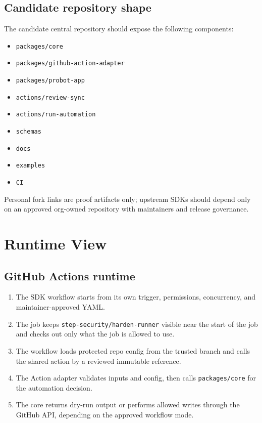 \documentclass[10pt, a4paper]{article}
\begin{document}
\subsection{Candidate repository shape}

The candidate central repository should expose the following components:

\begin{itemize}
  \item \texttt{packages/core}
  \item \texttt{packages/github-action-adapter}
  \item \texttt{packages/probot-app}
  \item \texttt{actions/review-sync}
  \item \texttt{actions/run-automation}
  \item \texttt{schemas}
  \item \texttt{docs}
  \item \texttt{examples}
  \item \texttt{CI}
\end{itemize}

Personal fork links are proof artifacts only; upstream SDKs should depend only on an approved
org-owned repository with maintainers and release governance.

\section{Runtime View}

\subsection{GitHub Actions runtime}

\begin{enumerate}
  \item The SDK workflow starts from its own trigger, permissions, concurrency,
        and maintainer-approved YAML.
  \item The job keeps \texttt{step-security/harden-runner} visible near the start of the job
        and checks out only what the job is allowed to use.
  \item The workflow loads protected repo config from the trusted branch and calls
        the shared action by a reviewed immutable reference.
  \item The Action adapter validates inputs and config, then calls \texttt{packages/core}
        for the automation decision.
  \item The core returns dry-run output or performs allowed writes through the GitHub API,
        depending on the approved workflow mode.
\end{enumerate}
\end{document}
